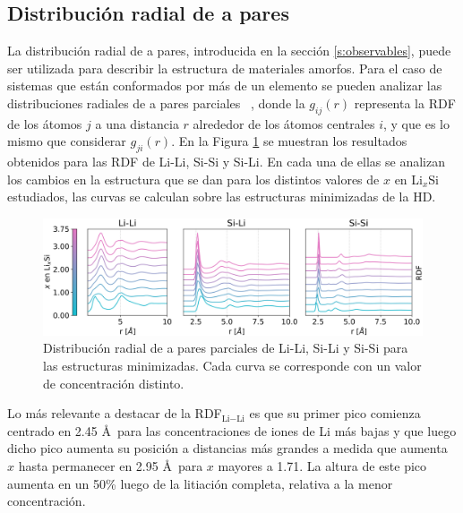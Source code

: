 \subsection{Distribución radial de a pares}

La distribución radial de a pares, introducida en la sección \ref{s:observables},
puede ser utilizada para describir la estructura de materiales amorfos. Para el 
caso de sistemas que están conformados por más de un elemento se pueden analizar 
las distribuciones radiales de a pares parciales ~\cite{lamparter1995}, donde la 
$g_{ij}(r)$ representa la RDF de los átomos $j$ a una distancia $r$ alrededor de 
los átomos centrales $i$, y que es lo mismo que considerar $g_{ji}(r)$. En la 
Figura \ref{fig:rdf} se muestran los resultados obtenidos para las RDF de Li-Li, 
Si-Si y Si-Li. En cada una de ellas se analizan los cambios en la estructura que 
se dan para los distintos valores de $x$ en Li$_x$Si estudiados, las curvas se 
calculan sobre las estructuras minimizadas de la HD.

\begin{figure}[h]
    \centering
    \includegraphics[width=\textwidth]{Silicio/caracterizacion/resultados/rdf/rdf.png}
    \caption{Distribución radial de a pares parciales de Li-Li, Si-Li y Si-Si 
    para las estructuras minimizadas. Cada curva se corresponde con un valor de 
    concentración distinto.}
    \label{fig:rdf}
\end{figure}

Lo más relevante a destacar de la RDF$_{\text{Li}-\text{Li}}$ es que su primer 
pico comienza 
centrado en 2.45 \AA\ para las concentraciones de iones de Li más bajas y que 
luego dicho pico aumenta su posición a distancias más grandes a medida que aumenta
$x$ hasta permanecer en 2.95 \AA\ para $x$ mayores a 1.71. La altura de este pico
aumenta en un 50\% luego de la litiación completa, relativa a la menor 
concentración.

